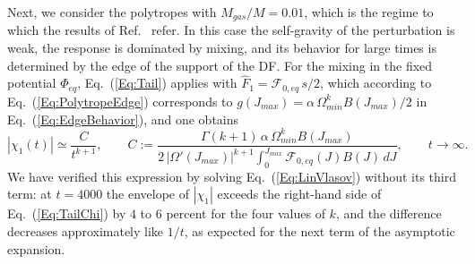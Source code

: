 Next, we consider the polytropes with $M_{gas}/M = 0.01$, which is the regime to which the results of Ref.~\cite{mHgRmScS25} refer. In this case the self-gravity of the perturbation is weak, the response is dominated by mixing, and its behavior for large times is determined by the edge of the support of the DF. For the mixing in the fixed potential $\Phi_{eq}$, Eq.~(\ref{Eq:Tail}) applies with $\hat{F}_1 = \mathcal{F}_{0,eq}\, s/2$, which according to Eq.~(\ref{Eq:PolytropeEdge}) corresponds to $g(J_{max}) = \alpha\,\Omega_{min}^k B(J_{max})/2$ in Eq.~(\ref{Eq:EdgeBehavior}), and one obtains
\begin{equation}
|\chi_1(t)|\simeq \frac{C}{t^{k+1}},\qquad
C := \frac{\Gamma(k+1)\,\alpha\,\Omega_{min}^k B(J_{max})}{2\,|\Omega'(J_{max})|^{k+1}\int_0^{J_{max}} \mathcal{F}_{0,eq}(J) B(J)\, dJ},\qquad t\to \infty.
\label{Eq:TailChi}
\end{equation}
We have verified this expression by solving Eq.~(\ref{Eq:LinVlasov}) without its third term: at $t = 4000$ the envelope of $|\chi_1|$ exceeds the right-hand side of Eq.~(\ref{Eq:TailChi}) by $4$ to $6$ percent for the four values of $k$, and the difference decreases approximately like $1/t$, as expected for the next term of the asymptotic expansion.

